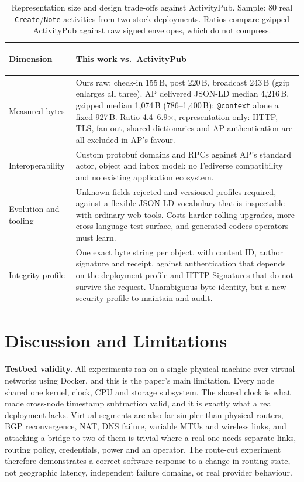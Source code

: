 \documentclass[conference,a4paper]{IEEEtran}
\begin{document}
\begin{table}[t]
  \caption{Representation size and design trade-offs against ActivityPub. Sample: 80 real
    \texttt{Create}/\texttt{Note} activities from two stock deployments. Ratios compare gzipped
    ActivityPub against raw signed envelopes, which do not compress.}
  \label{tab:tradeoff}
  \centering
  \scriptsize
  \setlength{\tabcolsep}{3pt}
  \begin{tabularx}{\columnwidth}{>{\bfseries\raggedright\arraybackslash}p{15mm}X}
    \toprule
    Dimension & This work vs.\ ActivityPub \\
    \midrule
    Measured bytes & Ours raw: check-in 155\,B, post 220\,B, broadcast 243\,B (gzip enlarges all
    three). AP delivered JSON-LD median 4{,}216\,B, gzipped median 1{,}074\,B (786--1{,}400\,B);
    \texttt{@context} alone a fixed 927\,B. Ratio 4.4--6.9$\times$, representation only: HTTP, TLS,
    fan-out, shared dictionaries and AP authentication are all excluded in AP's favour. \\
    \addlinespace[2pt]
    Interoper\-ability & Custom protobuf domains and RPCs against AP's standard actor, object and
    inbox model: no Fediverse compatibility and no existing application ecosystem. \\
    \addlinespace[2pt]
    Evolution and tooling & Unknown fields rejected and versioned profiles required, against a
    flexible JSON-LD vocabulary that is inspectable with ordinary web tools. Costs harder rolling
    upgrades, more cross-language test surface, and generated codecs operators must learn. \\
    \addlinespace[2pt]
    Integrity profile & One exact byte string per object, with content ID, author signature and
    receipt, against authentication that depends on the deployment profile and HTTP Signatures that
    do not survive the request. Unambiguous byte identity, but a new security profile to maintain
    and audit. \\
    \bottomrule
  \end{tabularx}
\end{table}

\section{Discussion and Limitations}
\label{sec:limits}

\textbf{Testbed validity.} All experiments ran on a single physical machine over virtual networks using Docker, and this is the paper's main limitation. Every node shared one kernel, clock, CPU and storage subsystem. The shared clock is what made cross-node timestamp subtraction valid, and it is exactly what a real deployment lacks. Virtual segments are also far simpler than physical routers, BGP reconvergence, NAT, DNS failure, variable MTUs and wireless links, and attaching a bridge to two of them is trivial where a real one needs separate links, routing policy, credentials, power and an operator. The route-cut experiment therefore demonstrates a correct software response to a change in routing state, not geographic latency, independent failure domains, or real provider behaviour.
\end{document}
